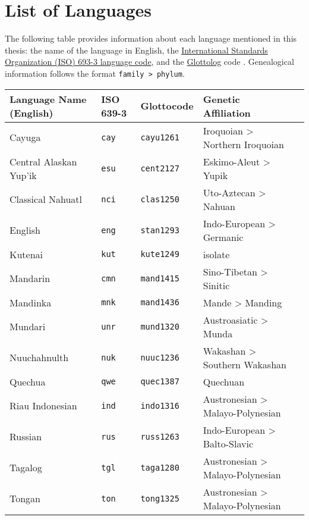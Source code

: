 \chapter*{List of Languages}
\label{ch:languages}

The following table provides information about each language mentioned in this thesis: the name of the language in English, the \href{https://iso639-3.sil.org/}{International Standards Organization (ISO) 693-3 language code}, and the \href{https://glottolog.org/}{Glottolog} code \citep{HammarstromForkelHaspelmath2019}. Genealogical information follows the format \texttt{family > phylum}.

\renewcommand{\arraystretch}{1}

\begin{table}[h]
  \onehalfspacing
  \begin{tabularx}{\linewidth}{ l l l l l }
    \textbf{Language Name (English)} & \textbf{ISO 639-3} & \textbf{Glottocode} & \textbf{Genetic Affiliation}\\
    \midrule
    Cayuga                           & \texttt{cay}       & \texttt{cayu1261}   & Iroquoian > Northern Iroquoian\\
    Central Alaskan Yup'ik           & \texttt{esu}       & \texttt{cent2127}   & Eskimo-Aleut > Yupik\\
    Classical Nahuatl                & \texttt{nci}       & \texttt{clas1250}   & Uto-Aztecan > Nahuan\\
    English                          & \texttt{eng}       & \texttt{stan1293}   & Indo-European > Germanic\\
    Kutenai                          & \texttt{kut}       & \texttt{kute1249}   & isolate\\
    Mandarin                         & \texttt{cmn}       & \texttt{mand1415}   & Sino-Tibetan > Sinitic\\
    Mandinka                         & \texttt{mnk}       & \texttt{mand1436}   & Mande > Manding\\
    Mundari                          & \texttt{unr}       & \texttt{mund1320}   & Austroasiatic > Munda\\
    Nuuchahnulth                     & \texttt{nuk}       & \texttt{nuuc1236}   & Wakashan > Southern Wakashan\\
    Quechua                          & \texttt{qwe}       & \texttt{quec1387}   & Quechuan\\
    Riau Indonesian                  & \texttt{ind}       & \texttt{indo1316}   & Austronesian > Malayo-Polynesian\\
    Russian                          & \texttt{rus}       & \texttt{russ1263}   & Indo-European > Balto-Slavic\\
    Tagalog                          & \texttt{tgl}       & \texttt{taga1280}   & Austronesian > Malayo-Polynesian\\
    Tongan                           & \texttt{ton}       & \texttt{tong1325}   & Austronesian > Malayo-Polynesian\\
  \end{tabularx}
\end{table}
